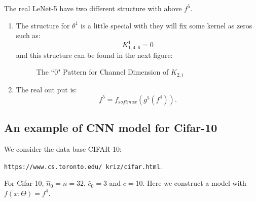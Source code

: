 \begin{remark}
	The real LeNet-5 have two different structure with above $f^5$.
	\begin{enumerate}
		\item The structure for $\theta^1$ is a little special with they will fix some kernel as zeros such as:
		\begin{equation}
		K^1_{1,4:6} = 0
		\end{equation}
		and this structure can be found in the next figure:
		\begin{figure}[!htb]\label{LeNet-Channel}
			\caption{The ``0" Pattern for Channel Dimension of $K_{2,i}$}      
		\end{figure}
		
		\item The real out put is:
		\begin{equation}
		f^5 = f_{softmax}(g^5(f^4)).
		\end{equation}
	\end{enumerate}
	
	
\end{remark}



\subsection{An example of CNN model for Cifar-10}
We consider the data base CIFAR-10:
\begin{center}
	{\tt https://www.cs.toronto.edu/~kriz/cifar.html}.  
\end{center}

For Cifar-10, $\hat n_0 = n = 32$, $\hat c_0 = 3$ and $c = 10$. Here we construct a
model with $f(x; \Theta) = f^4$.

